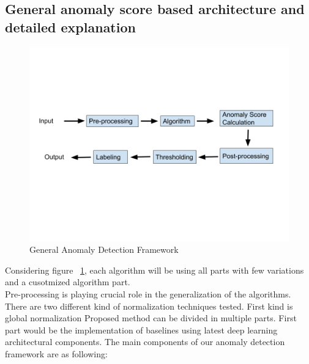 \documentclass[12pt]{article}
\begin{document}
\subsection{General anomaly score based architecture and detailed explanation}
\begin{figure}[H]
\centering
        \includegraphics[width=\textwidth]{images/generalAnomalyDetectionFrameWork.png}
    \caption{General Anomaly Detection Framework}
    \label{generalAnomalyDetectionFrameWork}
\end{figure}
Considering figure ~\ref{generalAnomalyDetectionFrameWork}, each algorithm will be using  
all parts with few variations and a cusotmized algorithm part.\\
\break
Pre-processing is playing crucial role in the generalization of the algorithms. There are two different kind of normalization techniques tested. First kind is global normalization
Proposed method can be divided in multiple parts. First part would be the implementation of baselines using latest deep learning architectural components. The main components of our anomaly detection framework are as following:
\end{document}
